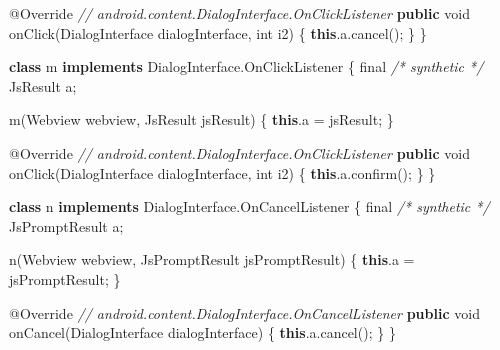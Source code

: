 \documentclass[
]{article}
\newenvironment{Shaded}{}{}
\newcommand{\AttributeTok}[1]{\textcolor[rgb]{0.49,0.56,0.16}{#1}}
\newcommand{\CommentTok}[1]{\textcolor[rgb]{0.38,0.63,0.69}{\textit{#1}}}
\newcommand{\DataTypeTok}[1]{\textcolor[rgb]{0.56,0.13,0.00}{#1}}
\newcommand{\FunctionTok}[1]{\textcolor[rgb]{0.02,0.16,0.49}{#1}}
\newcommand{\KeywordTok}[1]{\textcolor[rgb]{0.00,0.44,0.13}{\textbf{#1}}}
\newcommand{\NormalTok}[1]{#1}
\newcommand{\OperatorTok}[1]{\textcolor[rgb]{0.40,0.40,0.40}{#1}}
\begin{document}
\begin{Shaded}
\begin{Highlighting}[]
        \AttributeTok{@Override} \CommentTok{// android.content.DialogInterface.OnClickListener}
        \KeywordTok{public} \DataTypeTok{void} \FunctionTok{onClick}\OperatorTok{(}\NormalTok{DialogInterface dialogInterface}\OperatorTok{,} \DataTypeTok{int}\NormalTok{ i2}\OperatorTok{)} \OperatorTok{\{}
            \KeywordTok{this}\OperatorTok{.}\FunctionTok{a}\OperatorTok{.}\FunctionTok{cancel}\OperatorTok{();}
        \OperatorTok{\}}
    \OperatorTok{\}}

    \KeywordTok{class}\NormalTok{ m }\KeywordTok{implements}\NormalTok{ DialogInterface}\OperatorTok{.}\FunctionTok{OnClickListener} \OperatorTok{\{}
        \DataTypeTok{final} \CommentTok{/* synthetic */}\NormalTok{ JsResult a}\OperatorTok{;}

        \FunctionTok{m}\OperatorTok{(}\NormalTok{Webview webview}\OperatorTok{,}\NormalTok{ JsResult jsResult}\OperatorTok{)} \OperatorTok{\{}
            \KeywordTok{this}\OperatorTok{.}\FunctionTok{a} \OperatorTok{=}\NormalTok{ jsResult}\OperatorTok{;}
        \OperatorTok{\}}

        \AttributeTok{@Override} \CommentTok{// android.content.DialogInterface.OnClickListener}
        \KeywordTok{public} \DataTypeTok{void} \FunctionTok{onClick}\OperatorTok{(}\NormalTok{DialogInterface dialogInterface}\OperatorTok{,} \DataTypeTok{int}\NormalTok{ i2}\OperatorTok{)} \OperatorTok{\{}
            \KeywordTok{this}\OperatorTok{.}\FunctionTok{a}\OperatorTok{.}\FunctionTok{confirm}\OperatorTok{();}
        \OperatorTok{\}}
    \OperatorTok{\}}

    \KeywordTok{class}\NormalTok{ n }\KeywordTok{implements}\NormalTok{ DialogInterface}\OperatorTok{.}\FunctionTok{OnCancelListener} \OperatorTok{\{}
        \DataTypeTok{final} \CommentTok{/* synthetic */}\NormalTok{ JsPromptResult a}\OperatorTok{;}

        \FunctionTok{n}\OperatorTok{(}\NormalTok{Webview webview}\OperatorTok{,}\NormalTok{ JsPromptResult jsPromptResult}\OperatorTok{)} \OperatorTok{\{}
            \KeywordTok{this}\OperatorTok{.}\FunctionTok{a} \OperatorTok{=}\NormalTok{ jsPromptResult}\OperatorTok{;}
        \OperatorTok{\}}

        \AttributeTok{@Override} \CommentTok{// android.content.DialogInterface.OnCancelListener}
        \KeywordTok{public} \DataTypeTok{void} \FunctionTok{onCancel}\OperatorTok{(}\NormalTok{DialogInterface dialogInterface}\OperatorTok{)} \OperatorTok{\{}
            \KeywordTok{this}\OperatorTok{.}\FunctionTok{a}\OperatorTok{.}\FunctionTok{cancel}\OperatorTok{();}
        \OperatorTok{\}}
    \OperatorTok{\}}


\end{Highlighting}
\end{Shaded}
\end{document}
